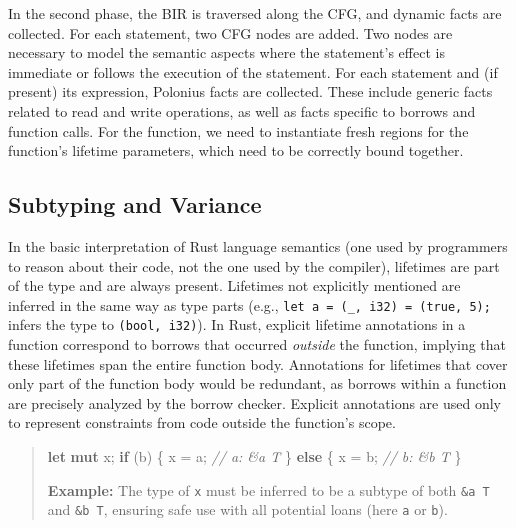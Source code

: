 \documentclass[
  11pt,
  twoside]{report}
\newenvironment{Shaded}{}{}
\newcommand{\CommentTok}[1]{\textit{#1}}
\newcommand{\ControlFlowTok}[1]{\textbf{#1}}
\newcommand{\KeywordTok}[1]{\textbf{#1}}
\newcommand{\NormalTok}[1]{#1}
\newcommand{\OperatorTok}[1]{#1}
\begin{document}
In the second phase, the BIR is traversed along the CFG, and dynamic
facts are collected. For each statement, two CFG nodes are added. Two
nodes are necessary to model the semantic aspects where the statement's
effect is immediate or follows the execution of the statement. For each
statement and (if present) its expression, Polonius facts are collected.
These include generic facts related to read and write operations, as
well as facts specific to borrows and function calls. For the function,
we need to instantiate fresh regions for the function's lifetime
parameters, which need to be correctly bound together.

\subsection{Subtyping and Variance}\label{sec:subtyping-and-variance}

In the basic interpretation of Rust language semantics (one used by
programmers to reason about their code, not the one used by the
compiler), lifetimes are part of the type and are always present.
Lifetimes not explicitly mentioned are inferred in the same way as type
parts (e.g., \texttt{let\ a\ =\ (\_,\ i32)\ =\ (true,\ 5);} infers the
type to \texttt{(bool,\ i32)}). In Rust, explicit lifetime annotations
in a function correspond to borrows that occurred \emph{outside} the
function, implying that these lifetimes span the entire function body.
Annotations for lifetimes that cover only part of the function body
would be redundant, as borrows within a function are precisely analyzed
by the borrow checker. Explicit annotations are used only to represent
constraints from code outside the function's scope.

\begin{quote}
\begin{Shaded}
\begin{Highlighting}[]
 \KeywordTok{let} \KeywordTok{mut}\NormalTok{ x}\OperatorTok{;}
 \ControlFlowTok{if}\NormalTok{ (b) }\OperatorTok{\{}
\NormalTok{     x }\OperatorTok{=}\NormalTok{ a}\OperatorTok{;} \CommentTok{// a: \&\textquotesingle{}a T}
 \OperatorTok{\}} \ControlFlowTok{else} \OperatorTok{\{}
\NormalTok{     x }\OperatorTok{=}\NormalTok{ b}\OperatorTok{;} \CommentTok{// b: \&\textquotesingle{}b T}
 \OperatorTok{\}}
\end{Highlighting}
\end{Shaded}

\textbf{Example:} The type of \texttt{x} must be inferred to be a
subtype of both \texttt{\&\textquotesingle{}a\ T} and
\texttt{\&\textquotesingle{}b\ T}, ensuring safe use with all potential
loans (here \texttt{a} or \texttt{b}).
\end{quote}
\end{document}
